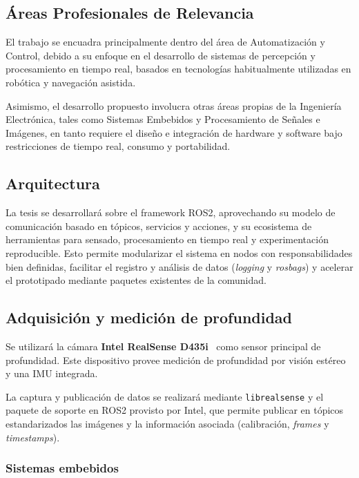 \subsection{Áreas Profesionales de Relevancia}

El trabajo se encuadra principalmente dentro del área de Automatización y Control, debido a su enfoque en el desarrollo de
sistemas de percepción y procesamiento en tiempo real, basados en tecnologías habitualmente utilizadas en robótica y navegación asistida.

Asimismo, el desarrollo propuesto involucra otras áreas propias de la Ingeniería Electrónica, tales como Sistemas Embebidos
y Procesamiento de Señales e Imágenes, en tanto requiere el diseño e integración de hardware y software bajo restricciones
de tiempo real, consumo y portabilidad.

\subsection{Arquitectura}

La tesis se desarrollará sobre el framework ROS2, aprovechando su modelo de comunicación basado en tópicos, servicios y
acciones, y su ecosistema de herramientas para sensado, procesamiento en tiempo real y experimentación reproducible.
Esto permite modularizar el sistema en nodos con responsabilidades bien definidas, facilitar el registro y análisis de
datos (\textit{logging} y \textit{rosbags}) y acelerar el prototipado mediante paquetes existentes de la comunidad.

\subsection{Adquisición y medición de profundidad}

Se utilizará la cámara \textbf{Intel RealSense D435i}~\cite{RS-D457} como sensor principal de profundidad.
Este dispositivo provee medición de profundidad por visión estéreo y una IMU integrada.

La captura y publicación de datos se realizará mediante \texttt{librealsense} y el paquete de soporte en ROS2
provisto por Intel, que permite publicar en tópicos estandarizados las imágenes y la información asociada
(calibración, \textit{frames} y \textit{timestamps}).

\subsubsection{Sistemas embebidos}

